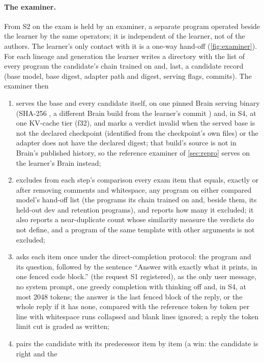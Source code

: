 \paragraph{The examiner.} From S2 on the exam is held by an examiner, a separate program operated
beside the learner by the same operators; it is independent of the learner, not of the authors. The
learner's only contact with it is a one-way hand-off (\cref{fig:examiner}). For each lineage and generation the learner writes a directory with
the list of every program the candidate's chain trained on and, last, a candidate record (base model,
base digest, adapter path and digest, serving flags, commits). The examiner then
\begin{enumerate}
\item serves the base and every candidate itself, on one pinned Brain serving binary (SHA-256
  , a different Brain build from the learner's commit ) and, in S4, at one KV-cache tier (f32), and marks a verdict invalid when the
  served base is not the declared checkpoint (identified from the checkpoint's own files) or the
  adapter does not have the declared digest; that build's source is not in Brain's published
  history, so the reference examiner of \cref{sec:repro} serves on the learner's Brain instead;
\item excludes from each step's comparison every exam item that equals, exactly or after removing
  comments and whitespace, any program on either compared model's hand-off list (the programs its
  chain trained on and, beside them, its held-out dev and retention programs), and reports how many
  it excluded; it also reports a near-duplicate count whose similarity measure the verdicts do not
  define, and a program of the same template with other arguments is not excluded;
\item asks each item once under the direct-completion protocol: the program and its question, followed
  by the sentence ``Answer with exactly what it prints, in one fenced code block.'' (the request S1
  registered), as the only user message, no system prompt, one greedy completion with thinking off and, in S4, at most
  2048 tokens; the answer is the last fenced block of the reply, or the whole reply if it has none,
  compared with the reference token by token per line with whitespace runs collapsed and blank lines
  ignored; a reply the token limit cut is graded as written;
\item pairs the candidate with its predecessor item by item (a win: the candidate is right and the

\end{enumerate}
